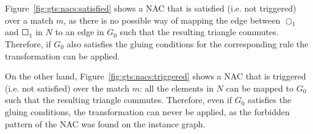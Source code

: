 \begin{example} Figure~\ref{fig:gts:nacs:satisfied} shows a NAC that is satisfied (i.e. not triggered) over a match $m$, as there is no possible way of mapping the edge between $\Circle_1$ and $\Square_1$ in $N$ to an edge in $G_0$ such that the resulting triangle commutes. Therefore, if $G_0$ also satisfies the gluing conditions for the corresponding rule the transformation can be applied.

  On the other hand, Figure~\ref{fig:gts:nacs:triggered} shows a NAC that is triggered (i.e. not satisfied) over the match $m$: all the elements in $N$ can be mapped to $G_0$ such that the resulting triangle commutes. Therefore, even if $G_0$ satisfies the gluing conditions, the transformation can never be applied, as the forbidden pattern of the NAC was found on the instance graph.
  

\end{example}
